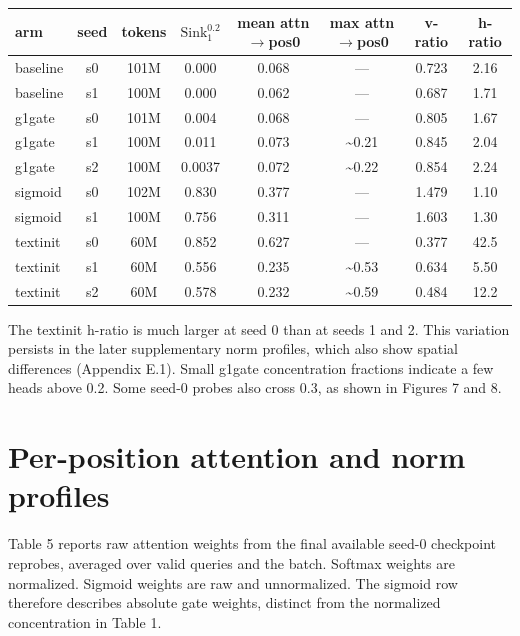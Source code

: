 \documentclass{article}
\begin{document}
\begin{center}
\begin{minipage}{\linewidth}
\makeatletter{}\makeatother
  \centering
  \small
  \caption{\textbf{Per-seed signatures at the comparison checkpoints.}}
  \begin{tabular}{lccccccc}
    \toprule
    arm & seed & tokens & $\mathrm{Sink}^{0.2}_{1}$ & mean attn$\rightarrow$pos0 & max attn$\rightarrow$pos0 & v-ratio & h-ratio \\
    \midrule
    baseline & s0 & 101M & 0.000 & 0.068 & --- & 0.723 & 2.16 \\
    baseline & s1 & 100M & 0.000 & 0.062 & --- & 0.687 & 1.71 \\
    g1gate & s0 & 101M & 0.004 & 0.068 & --- & 0.805 & 1.67 \\
    g1gate & s1 & 100M & 0.011 & 0.073 & \textasciitilde{}0.21 & 0.845 & 2.04 \\
    g1gate & s2 & 100M & 0.0037 & 0.072 & \textasciitilde{}0.22 & 0.854 & 2.24 \\
    sigmoid & s0 & 102M & 0.830 & 0.377 & --- & 1.479 & 1.10 \\
    sigmoid & s1 & 100M & 0.756 & 0.311 & --- & 1.603 & 1.30 \\
    textinit & s0 & 60M & 0.852 & 0.627 & --- & 0.377 & 42.5 \\
    textinit & s1 & 60M & 0.556 & 0.235 & \textasciitilde{}0.53 & 0.634 & 5.50 \\
    textinit & s2 & 60M & 0.578 & 0.232 & \textasciitilde{}0.59 & 0.484 & 12.2 \\
    \bottomrule
  \end{tabular}
\end{minipage}
\end{center}

The textinit h-ratio is much larger at seed 0 than at seeds 1 and 2. This variation persists in the later supplementary norm profiles, which also show spatial differences (Appendix E.1). Small g1gate concentration fractions indicate a few heads above 0.2. Some seed-0 probes also cross 0.3, as shown in Figures 7 and 8.

\FloatBarrier
\section{Per-position attention and norm profiles}

Table 5 reports raw attention weights from the final available seed-0 checkpoint reprobes, averaged over valid queries and the batch. Softmax weights are normalized. Sigmoid weights are raw and unnormalized. The sigmoid row therefore describes absolute gate weights, distinct from the normalized concentration in Table 1.
\end{document}

